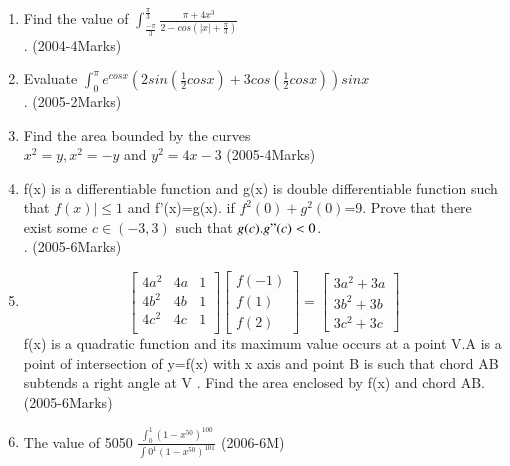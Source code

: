 \documentclass[journal,12pt,twocolumn]{IEEEtran}
\theoremstyle{remark}
\begin{document}
\begin{enumerate}
							      \item  Find the value of $\int_{\frac{-\pi}{3}}^{\frac{\pi}{3}}\frac{\pi+4x^3}{2-cos(|x|+\frac{\pi}{3})}$\\.
								\hfill{(2004-4Marks)}
								\item	Evaluate $\int_{0}^{\pi}e^{cosx}(2sin(\frac{1}{2}cosx)+3cos(\frac{1}{2}cosx))sinx$\\.
								\hfill{(2005-2Marks)}
							      \item Find the area bounded by the curves \\  
$x^2=y,x^2=-y$ and $y^2=4x-3$
																						          \hfill{(2005-4Marks)}
																							  \item  f(x) is a differentiable function and g(x) is  double differentiable function such that $f(x)|\le1$ and f'(x)=g(x). if $f^2(0)+g^2(0)$=9. Prove that there exist some $c\in(-3,3)$ such that $g(c).g"(c)<0$.\\.
								\hfill{(2005-6Marks)}

						        	\item 
  \[
\begin{bmatrix}
4a^2 & 4a & 1\\
4b^2 & 4b & 1\\						      4c^2 & 4c & 1\\
\end{bmatrix}
\begin{bmatrix}
f(-1)\\
f(1)\\
f(2)
																														         \end{bmatrix}
																															    =
																															\begin{bmatrix}
3a^2+3a\\						
3b^2+3b\\
3c^2+3c
\end{bmatrix}
\]
f(x) is a quadratic function and its maximum value occurs at a point V.A is a point of intersection of y=f(x) with x axis and point B is such that chord AB subtends a right angle at V . Find the area enclosed by f(x) and chord AB.
\hfill{(2005-6Marks)}
\item The value of 5050 $\frac{\int_{0}^{1}(1-x^50)^100}{\int{0}^{1} {(1-x^50)^101}}$
\hfill{(2006-6M)}


\end{enumerate}
\end{document}
